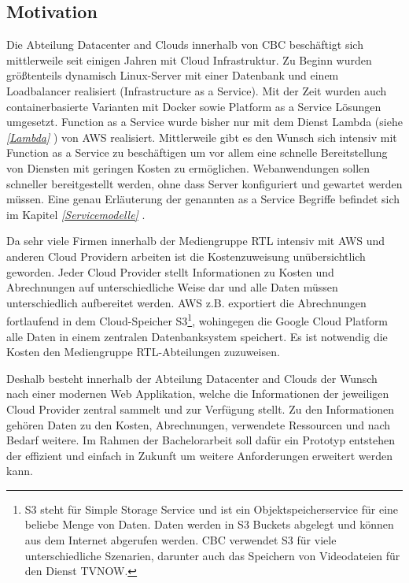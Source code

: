 \subsection{Motivation}
\label{Motivation}
Die Abteilung Datacenter and Clouds innerhalb von CBC beschäftigt sich mittlerweile seit einigen Jahren mit Cloud Infrastruktur.
Zu Beginn wurden größtenteils dynamisch Linux-Server mit einer Datenbank und einem Loadbalancer realisiert (Infrastructure as a Service).
Mit der Zeit wurden auch containerbasierte Varianten mit Docker sowie Platform as a Service Lösungen umgesetzt.
Function as a Service wurde bisher nur mit dem Dienst Lambda (siehe \textit{\ref{Lambda} }) von AWS realisiert.
Mittlerweile gibt es den Wunsch sich intensiv mit Function as a Service zu beschäftigen um vor allem eine schnelle Bereitstellung von Diensten mit geringen Kosten zu ermöglichen.
Webanwendungen sollen schneller bereitgestellt werden, ohne dass Server konfiguriert und gewartet werden müssen.
Eine genau Erläuterung der genannten \glqq [...] as a Service\grqq{} Begriffe befindet sich im Kapitel \textit{\ref{Servicemodelle} }.

Da sehr viele Firmen innerhalb der Mediengruppe RTL intensiv mit AWS und anderen Cloud Providern arbeiten ist die Kostenzuweisung unübersichtlich geworden.
Jeder Cloud Provider stellt Informationen zu Kosten und Abrechnungen auf unterschiedliche Weise dar und alle Daten müssen unterschiedlich aufbereitet werden.
AWS z.B. exportiert die Abrechnungen fortlaufend in dem Cloud-Speicher
S3\footnote{S3 steht für Simple Storage Service und ist ein Objektspeicherservice für eine beliebe Menge von Daten.
Daten werden in S3 Buckets abgelegt und können aus dem Internet abgerufen werden.
CBC verwendet S3 für viele unterschiedliche Szenarien, darunter auch das Speichern von Videodateien für den Dienst TVNOW.}, wohingegen die Google Cloud Platform alle Daten in einem zentralen Datenbanksystem speichert.
Es ist notwendig die Kosten den Mediengruppe RTL-Abteilungen zuzuweisen.

Deshalb besteht innerhalb der Abteilung Datacenter and Clouds der Wunsch nach einer modernen Web Applikation, welche die Informationen der jeweiligen Cloud Provider zentral sammelt und zur Verfügung stellt.
Zu den Informationen gehören Daten zu den Kosten, Abrechnungen, verwendete Ressourcen und nach Bedarf weitere.
Im Rahmen der Bachelorarbeit soll dafür ein Prototyp entstehen der effizient und einfach in Zukunft um weitere Anforderungen erweitert werden kann.

